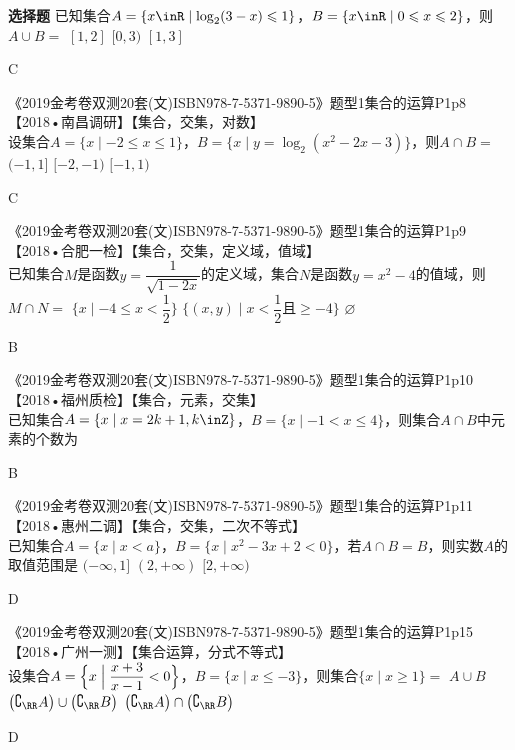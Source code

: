 \begin{exercise}{\bf 选择题}
      已知集合$A=\{x\inR\mid \log_2(3-x)\leqslant 1\}$，$B=\{x\inR\mid 0\leqslant x\leqslant 2\}$，则$A\cup B=$\xz
      \xx{$[0,3]$}
       {$[1,2]$}
       {$[0,3)$}
       {$[1,3]$}
      \begin{answer}
        C
      \end{answer}
    \item 《2019金考卷双测20套(文)ISBN978-7-5371-9890-5》题型1集合的运算P1p8【2018•南昌调研】【集合，交集，对数】\\
      设集合$A=\{x\mid -2\leqslant x\leqslant 1\}$，$B=\{x\mid y=\log_2{(x^2-2x-3)}\}$，则$A\cap B=$\xz
      \xx{$[-2,1)$}
       {$(-1,1]$}
       {$[-2,-1)$}
       {$[-1,1)$}
      \begin{answer}
        C
      \end{answer}
    \item 《2019金考卷双测20套(文)ISBN978-7-5371-9890-5》题型1集合的运算P1p9【2018•合肥一检】【集合，交集，定义域，值域】\\
      已知集合$M$是函数$y=\dfrac1{\sqrt{1-2x}}$的定义域，集合$N$是函数$y=x^2-4$的值域，则$M\cap N=$\xz
       {$\{x\mid -4\leqslant x< \dfrac12\}$}
       {$\{(x,y)\mid x< \dfrac12\text{且}\geqslant -4\}$}
       {$\varnothing$}
      \begin{answer}
        B
      \end{answer}
    \item 《2019金考卷双测20套(文)ISBN978-7-5371-9890-5》题型1集合的运算P1p10【2018•福州质检】【集合，元素，交集】\\
      已知集合$A=\{x\mid x=2k+1,k\inZ\}$，$B=\{x\mid -1<x\leqslant4\}$，则集合$A\cap B$中元素的个数为\xz
      \begin{answer}
        B
      \end{answer}
    \item 《2019金考卷双测20套(文)ISBN978-7-5371-9890-5》题型1集合的运算P1p11【2018•惠州二调】【集合，交集，二次不等式】\\
      已知集合$A=\{x\mid x<a\}$，$B=\{x\mid x^2-3x+2<0\}$，若$A\cap B=B$，则实数$A$的取值范围是\xz
       {$(-\infty,1]$}
       {$(2,+\infty)$}
       {$[2,+\infty)$}
      \begin{answer}
        D
      \end{answer}
    \item 《2019金考卷双测20套(文)ISBN978-7-5371-9890-5》题型1集合的运算P1p15【2018•广州一测】【集合运算，分式不等式】\\
      设集合$A=\Bigl\{x\Bigm| \dfrac{x+3}{x-1}<0\Bigr\}$，$B=\{x\mid x\leqslant{-3}\}$，则集合$\{x\mid x\geqslant1\}=$\xz
       {$A\cup B$}
       {$\bigl(\complement_{\RR}A\bigr)\cup \bigl(\complement_{\RR}B\bigr)$}
       {$\bigl(\complement_{\RR}A\bigr)\cap \bigl(\complement_{\RR}B\bigr)$}
      \begin{answer}
        D
      \end{answer}
  \end{exercise}
